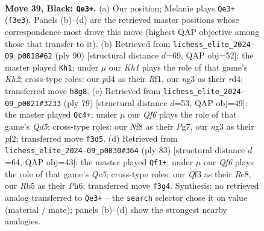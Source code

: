 \documentclass[11pt]{article}
\begin{document}
\clearpage

\begin{figure}[p]\centering
\begin{subfigure}{0.46\textwidth}\centering
\resizebox{\linewidth}{!}{%
\newchessgame
\chessboard[
  setfen={5n1k/ppQ4p/7p/1r6/3P4/5qN1/8/R5KR b - - 3 39},
  showmover=false,
  pgfstyle=straightmove, color=movearrow, markmove={f3-e3}
]}
\caption{}
\end{subfigure}\hfill
\begin{subfigure}{0.46\textwidth}\centering
\resizebox{\linewidth}{!}{%
\newchessgame
\chessboard[
  setfen={k1r5/p7/4p3/4N3/2PrqP1p/7P/5QPK/5R2 w - - 7 46},
  showmover=false,
  pgfstyle=straightmove, color=movearrow, markmove={h2-h1}
]}
\caption{}
\end{subfigure}
\\[4pt]
\begin{subfigure}{0.46\textwidth}\centering
\resizebox{\linewidth}{!}{%
\newchessgame
\chessboard[
  setfen={8/1p4pk/p3Q3/3p4/3q4/8/1RK2P2/7r b - - 9 40},
  showmover=false,
  pgfstyle=straightmove, color=movearrow, markmove={d4-c4}
]}
\caption{}
\end{subfigure}\hfill
\begin{subfigure}{0.46\textwidth}\centering
\resizebox{\linewidth}{!}{%
\newchessgame
\chessboard[
  setfen={2r3k1/Q1N2pp1/1p1Rp2p/8/P1q5/8/8/2RK4 b - - 17 42},
  showmover=false,
  pgfstyle=straightmove, color=movearrow, markmove={c4-f1}
]}
\caption{}
\end{subfigure}
\caption{\textbf{Move 39, Black: \texttt{Qe3+}.} (a) Our position; Melanie plays \texttt{Qe3+} (\texttt{f3e3}). Panels (b)--(d) are the retrieved master positions whose correspondence most drove this move (highest QAP objective among those that transfer to it). (b) Retrieved from \texttt{lichess\_elite\_2024-09\_p0018\#62} (ply 90) [structural distance $d$=69, QAP obj=52]: the master played \texttt{Kh1}; under $\mu$ our \emph{Kh1} plays the role of that game's \emph{Kh2}; cross-type roles: our \emph{p}d4 as their \emph{R}f1, our \emph{n}g3 as their \emph{r}d4; transferred move \texttt{h8g8}. (c) Retrieved from \texttt{lichess\_elite\_2024-09\_p0021\#3233} (ply 79) [structural distance $d$=53, QAP obj=49]: the master played \texttt{Qc4+}; under $\mu$ our \emph{Qf6} plays the role of that game's \emph{Qd5}; cross-type roles: our \emph{N}f8 as their \emph{P}g7, our \emph{n}g3 as their \emph{p}f2; transferred move \texttt{f3d5}. (d) Retrieved from \texttt{lichess\_elite\_2024-09\_p0030\#364} (ply 83) [structural distance $d$=64, QAP obj=43]: the master played \texttt{Qf1+}; under $\mu$ our \emph{Qf6} plays the role of that game's \emph{Qc5}; cross-type roles: our \emph{Q}f3 as their \emph{R}c8, our \emph{R}b5 as their \emph{P}h6; transferred move \texttt{f3g4}. Synthesis: no retrieved analog transferred to \texttt{Qe3+} -- the \texttt{search} selector chose it on value (material / mate); panels (b)--(d) show the strongest nearby analogies.}
\label{fig:thought-m77}
\end{figure}
\end{document}
